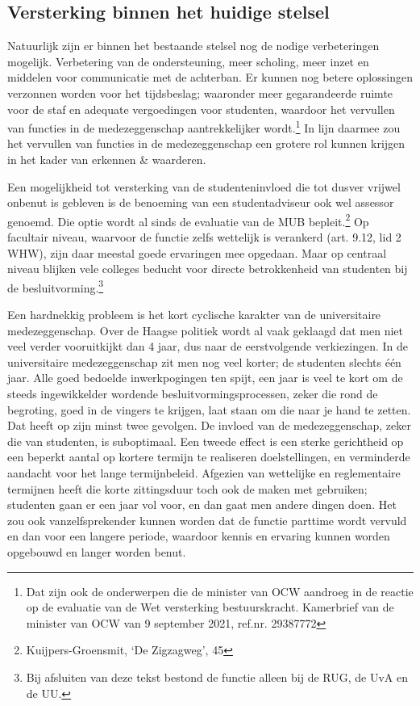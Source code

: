\documentclass[smallauthor, chapterhaspagenum, nochapterinheader, pagenuminheader,  bigchapnum,medium2, tocpages, garamond, titleinheader]{jote-book}
\begin{document}
	\subsection{Versterking binnen het huidige stelsel }



	Natuurlijk zijn er binnen het bestaande stelsel nog de nodige verbeteringen mogelijk. Verbetering van de ondersteuning, meer scholing, meer inzet en middelen voor communicatie met de achterban. Er kunnen nog betere oplossingen verzonnen worden voor het tijdsbeslag; waaronder meer gegarandeerde ruimte voor de staf en adequate vergoedingen voor studenten, waardoor het vervullen van functies in de medezeggenschap aantrekkelijker wordt.\footnote{Dat zijn ook de onderwerpen die de minister van OCW aandroeg in de reactie op de evaluatie van de Wet versterking bestuurskracht. Kamerbrief van de minister van OCW van 9 september 2021, ref.nr. 29387772} In lijn daarmee zou het vervullen van functies in de medezeggenschap een grotere rol kunnen krijgen in het kader van erkennen \& waarderen.



	Een mogelijkheid tot versterking van de studenteninvloed die tot dusver vrijwel onbenut is gebleven is de benoeming van een studentadviseur ook wel assessor genoemd. Die optie wordt al sinds de evaluatie van de MUB bepleit.\footnote{Kuijpers-Groensmit, ‘De Zigzagweg', 45} Op facultair niveau, waarvoor de functie zelfs wettelijk is verankerd (art. 9.12, lid 2 WHW), zijn daar meestal goede ervaringen mee opgedaan. Maar op centraal niveau blijken vele colleges beducht voor directe betrokkenheid van studenten bij de besluitvorming.\footnote{Bij afsluiten van deze tekst bestond de functie alleen bij de RUG, de UvA en de UU.}



	Een hardnekkig probleem is het kort cyclische karakter van de universitaire medezeggenschap. Over de Haagse politiek wordt al vaak geklaagd dat men niet veel verder vooruitkijkt dan 4 jaar, dus naar de eerstvolgende verkiezingen. In de universitaire medezeggenschap zit men nog veel korter; de studenten slechts één jaar. Alle goed bedoelde inwerkpogingen ten spijt, een jaar is veel te kort om de steeds ingewikkelder wordende besluitvormingsprocessen, zeker die rond de begroting, goed in de vingers te krijgen, laat staan om die naar je hand te zetten. Dat heeft op zijn minst twee gevolgen. De invloed van de medezeggenschap, zeker die van studenten, is suboptimaal. Een tweede effect is een sterke gerichtheid op een beperkt aantal op kortere termijn te realiseren doelstellingen, en verminderde aandacht voor het lange termijnbeleid. Afgezien van wettelijke en reglementaire termijnen heeft die korte zittingsduur toch ook de maken met gebruiken; studenten gaan er een jaar vol voor, en dan gaat men andere dingen doen. Het zou ook vanzelfsprekender kunnen worden dat de functie parttime wordt vervuld en dan voor een langere periode, waardoor kennis en ervaring kunnen worden opgebouwd en langer worden benut.
\end{document}
